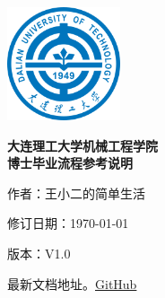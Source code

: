 \documentclass[12pt,a4paper]{ctexart}
\begin{document}
\begin{titlepage}

  \centering

        \includegraphics[width=0.25\textwidth]{images/logo.png}  %


      
    \vspace{2cm}  %
    \centering
    \Huge \bfseries 大连理工大学机械工程学院\\
    \vspace{0.5cm}
    \Huge \bfseries 博士毕业流程参考说明\\
    \vspace{4cm}  %
    

        \normalsize 作者：王小二的简单生活\\
        \vspace{0.3cm}
        
        修订日期：\today\\
        \vspace{0.3cm}
        
        版本：V1.0
        \vspace{0.3cm}
        
        最新文档地址。\href{https://github.com/DrHanks91/DUTMePhDProcess.git}{GitHub}

    
    \vfill
\end{titlepage}

\clearpage  %

\pagestyle{fancy}

\fancyhf{}


\fancyfoot[C]{\thepage}
\fancyfoot[C]{\thepage}
\renewcommand{\headrulewidth}{1.5pt}  %
\tableofcontents
\end{document}
